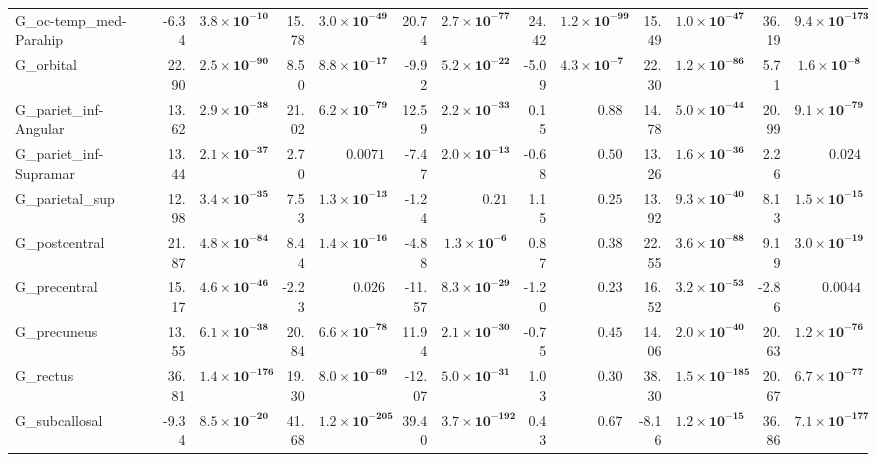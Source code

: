 {\begin{longtable}{llrrrrrrrrrrrr}
G\_oc-temp\_med-Parahip &  & -6.34 & $\mathbf{3.8{\times}10^{-10}}$ & 15.78 & $\mathbf{3.0{\times}10^{-49}}$ & 20.74 & $\mathbf{2.7{\times}10^{-77}}$ & 24.42 & $\mathbf{1.2{\times}10^{-99}}$ & 15.49 & $\mathbf{1.0{\times}10^{-47}}$ & 36.19 & $\mathbf{9.4{\times}10^{-173}}$ \\
G\_orbital &  & 22.90 & $\mathbf{2.5{\times}10^{-90}}$ & 8.50 & $\mathbf{8.8{\times}10^{-17}}$ & -9.92 & $\mathbf{5.2{\times}10^{-22}}$ & -5.09 & $\mathbf{4.3{\times}10^{-7}}$ & 22.30 & $\mathbf{1.2{\times}10^{-86}}$ & 5.71 & $\mathbf{1.6{\times}10^{-8}}$ \\
G\_pariet\_inf-Angular &  & 13.62 & $\mathbf{2.9{\times}10^{-38}}$ & 21.02 & $\mathbf{6.2{\times}10^{-79}}$ & 12.59 & $\mathbf{2.2{\times}10^{-33}}$ & 0.15 & $0.88$ & 14.78 & $\mathbf{5.0{\times}10^{-44}}$ & 20.99 & $\mathbf{9.1{\times}10^{-79}}$ \\
G\_pariet\_inf-Supramar &  & 13.44 & $\mathbf{2.1{\times}10^{-37}}$ & 2.70 & $0.0071$ & -7.47 & $\mathbf{2.0{\times}10^{-13}}$ & -0.68 & $0.50$ & 13.26 & $\mathbf{1.6{\times}10^{-36}}$ & 2.26 & $0.024$ \\
G\_parietal\_sup &  & 12.98 & $\mathbf{3.4{\times}10^{-35}}$ & 7.53 & $\mathbf{1.3{\times}10^{-13}}$ & -1.24 & $0.21$ & 1.15 & $0.25$ & 13.92 & $\mathbf{9.3{\times}10^{-40}}$ & 8.13 & $\mathbf{1.5{\times}10^{-15}}$ \\
G\_postcentral &  & 21.87 & $\mathbf{4.8{\times}10^{-84}}$ & 8.44 & $\mathbf{1.4{\times}10^{-16}}$ & -4.88 & $\mathbf{1.3{\times}10^{-6}}$ & 0.87 & $0.38$ & 22.55 & $\mathbf{3.6{\times}10^{-88}}$ & 9.19 & $\mathbf{3.0{\times}10^{-19}}$ \\
G\_precentral &  & 15.17 & $\mathbf{4.6{\times}10^{-46}}$ & -2.23 & $0.026$ & -11.57 & $\mathbf{8.3{\times}10^{-29}}$ & -1.20 & $0.23$ & 16.52 & $\mathbf{3.2{\times}10^{-53}}$ & -2.86 & $0.0044$ \\
G\_precuneus &  & 13.55 & $\mathbf{6.1{\times}10^{-38}}$ & 20.84 & $\mathbf{6.6{\times}10^{-78}}$ & 11.94 & $\mathbf{2.1{\times}10^{-30}}$ & -0.75 & $0.45$ & 14.06 & $\mathbf{2.0{\times}10^{-40}}$ & 20.63 & $\mathbf{1.2{\times}10^{-76}}$ \\
G\_rectus &  & 36.81 & $\mathbf{1.4{\times}10^{-176}}$ & 19.30 & $\mathbf{8.0{\times}10^{-69}}$ & -12.07 & $\mathbf{5.0{\times}10^{-31}}$ & 1.03 & $0.30$ & 38.30 & $\mathbf{1.5{\times}10^{-185}}$ & 20.67 & $\mathbf{6.7{\times}10^{-77}}$ \\
G\_subcallosal &  & -9.34 & $\mathbf{8.5{\times}10^{-20}}$ & 41.68 & $\mathbf{1.2{\times}10^{-205}}$ & 39.40 & $\mathbf{3.7{\times}10^{-192}}$ & 0.43 & $0.67$ & -8.16 & $\mathbf{1.2{\times}10^{-15}}$ & 36.86 & $\mathbf{7.1{\times}10^{-177}}$ \\

\end{longtable}}
